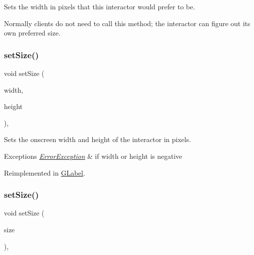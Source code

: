 Sets the width in pixels that this interactor would prefer to be. 

Normally clients do not need to call this method; the interactor can figure out its own preferred size. \mbox{\label{classGInteractor_aca25d49481f9bf5fc8f7df4c086c4ce7}} 
\subsubsection{\texorpdfstring{set\+Size()}{setSize()}\hspace{0.1cm}{\footnotesize\ttfamily [1/2]}}
{\footnotesize\ttfamily void set\+Size (\begin{DoxyParamCaption}\item[{double}]{width,  }\item[{double}]{height }\end{DoxyParamCaption})\hspace{0.3cm}{\ttfamily [virtual]}, {\ttfamily [inherited]}}



Sets the onscreen width and height of the interactor in pixels. 


\begin{DoxyExceptions}{Exceptions}
{\em \mbox{\hyperlink{classErrorException}{Error\+Exception}}} & if width or height is negative \\
\hline
\end{DoxyExceptions}


Reimplemented in \mbox{\hyperlink{classGLabel_ae7e6371aa2311d6f18caf8f7be59704d}{G\+Label}}.

\mbox{\label{classGInteractor_ae2b628228f192c2702c4ce941b2af68f}} 
\subsubsection{\texorpdfstring{set\+Size()}{setSize()}\hspace{0.1cm}{\footnotesize\ttfamily [2/2]}}
{\footnotesize\ttfamily void set\+Size (\begin{DoxyParamCaption}\item[{const \mbox{\hyperlink{classGDimension}{G\+Dimension}} \&}]{size }\end{DoxyParamCaption})\hspace{0.3cm}{\ttfamily [virtual]}, {\ttfamily [inherited]}}




